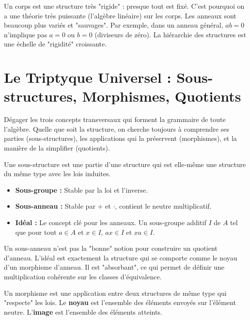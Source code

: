 \begin{remark}
    Un corps est une structure très "rigide" : presque tout est fixé. C'est pourquoi on a une théorie très puissante (l'algèbre linéaire) sur les corps. Les anneaux sont beaucoup plus variés et "sauvages". Par exemple, dans un anneau général, $ab=0$ n'implique pas $a=0$ ou $b=0$ (diviseurs de zéro). La hiérarchie des structures est une échelle de "rigidité" croissante.
\end{remark}

\section{Le Triptyque Universel : Sous-structures, Morphismes, Quotients}

\begin{objectif}
    Dégager les trois concepts transversaux qui forment la grammaire de toute l'algèbre. Quelle que soit la structure, on cherche toujours à comprendre ses parties (sous-structures), les applications qui la préservent (morphismes), et la manière de la simplifier (quotients).
\end{objectif}

\begin{definition}
    Une sous-structure est une partie d'une structure qui est elle-même une structure du même type avec les lois induites.
    \begin{itemize}
        \item \textbf{Sous-groupe :} Stable par la loi et l'inverse.
        \item \textbf{Sous-anneau :} Stable par $+$ et $\cdot$, contient le neutre multiplicatif.
        \item \textbf{Idéal :} Le concept clé pour les anneaux. Un sous-groupe additif $I$ de $A$ tel que pour tout $a \in A$ et $x \in I$, $ax \in I$ et $xa \in I$.
    \end{itemize}
\end{definition}

\begin{remark}
    Un sous-anneau n'est pas la "bonne" notion pour construire un quotient d'anneau. L'idéal est exactement la structure qui se comporte comme le noyau d'un morphisme d'anneau. Il est "absorbant", ce qui permet de définir une multiplication cohérente sur les classes d'équivalence.
\end{remark}

\begin{definition}[Morphismes]
    Un morphisme est une application entre deux structures de même type qui "respecte" les lois. Le \textbf{noyau} est l'ensemble des éléments envoyés sur l'élément neutre. L'\textbf{image} est l'ensemble des éléments atteints.
\end{definition}

